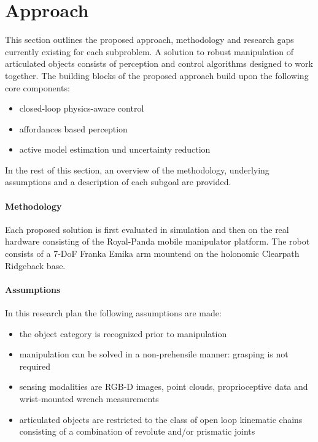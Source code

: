 \section{Approach}
\label{sec:Approach}

This section outlines the proposed approach, methodology and research gaps currently existing for each subproblem. A solution to robust manipulation of articulated objects consists of perception and control algorithms designed to work together. The building blocks of the proposed approach build upon the following core components:
\begin{itemize}
\item closed-loop physics-aware control
\item affordances based perception
\item active model estimation und uncertainty reduction
\end{itemize}
In the rest of this section, an overview of the methodology, underlying assumptions and a description of each subgoal are provided. 

\paragraph{Methodology} Each proposed solution is first evaluated in simulation and then on the real hardware consisting of the Royal-Panda mobile manipulator platform. The robot consists of a 7-DoF Franka Emika arm mountend on the holonomic Clearpath Ridgeback base. 

\paragraph{Assumptions} In this research plan the following assumptions are made:
\begin{itemize}
\item the object category is recognized prior to manipulation
\item manipulation can be solved in a non-prehensile manner: grasping is not required
\item sensing modalities are RGB-D images, point clouds, proprioceptive data and wrist-mounted wrench measurements 
\item articulated objects are restricted to the class of open loop kinematic chains consisting of a combination of revolute and/or prismatic joints
\end{itemize} 

